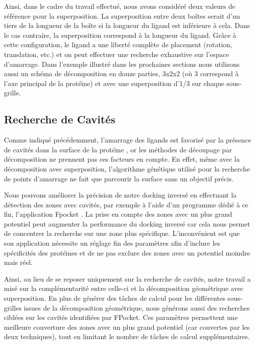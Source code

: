 Ainsi, dans le cadre du travail effectué, nous avons considéré deux valeurs de référence pour la superposition. La superposition entre deux boîtes serait d'un tiers de la longueur de la boîte si la longueur du ligand est inférieure à cela. Dans le cas contraire, la superposition correspond à la longueur du ligand. Grâce à cette configuration, le ligand a une liberté complète de placement (rotation, translation, etc.) et on peut effectuer une recherche exhaustive sur l'espace d'amarrage. Dans l'exemple illustré dans les prochaines sections nous utilisons aussi un schéma de décomposition en douze parties, 3x2x2 (où 3 correspond à l'axe principal de la protéine) et avec une superposition d'1/3 sur chaque sous-grille. 

\subsection{Recherche de Cavités}
Comme indiqué précédemment, l'amarrage des ligands est favorisé par la présence de cavités dans la surface de la protéine \cite{Ghersi2009,Hetenyi2011}, or les méthodes de découpage par décomposition ne prennent pas ces facteurs en compte. En effet, même avec la décomposition avec superposition, l'algorithme génétique utilisé pour la recherche de points d'amarrage ne fait que parcourir la surface sans un objectif précis. 

Nous pouvons améliorer la précision de notre docking inversé en effectuant la détection des zones avec cavités, par exemple à l'aide d'un programme dédié à ce fin, l'application Fpocket \cite{Guilloux09a}. La prise en compte des zones avec un plus grand potentiel peut augmenter la performance du docking inversé car cela nous permet de concentrer la recherche sur une zone plus spécifique. L'inconvénient est que son application nécessite un réglage fin des paramètres afin d'inclure les spécificités des protéines et de ne pas exclure des zones avec un potentiel moindre mais réel. 

Ainsi, au lieu de se reposer uniquement sur la recherche de cavités, notre travail a misé sur la complémentarité entre celle-ci et la décomposition géométrique avec superposition. En plus de générer des tâches de calcul pour les différentes sous-grilles issues de la décomposition géométrique, nous générons aussi des recherches ciblées sur les cavités identifiées par FPocket. Ces paramètres permettent une meilleure couverture des zones avec un plus grand potentiel (car couvertes par les deux techniques), tout en limitant le nombre de tâches de calcul supplémentaires.



